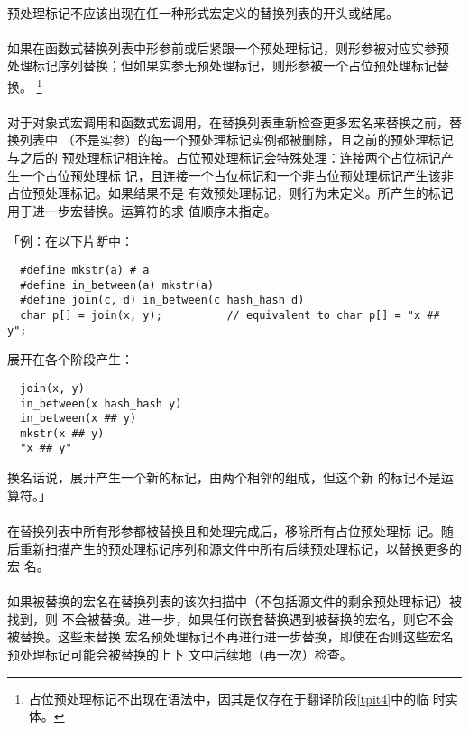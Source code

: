 \paragraph{}
\tm{\#\#}预处理标记不应该出现在任一种形式宏定义的替换列表的开头或结尾。

\paragraph{}
如果在函数式替换列表中形参前或后紧跟一个\tm{\#\#}预处理标记，则形参被对应实参预
处理标记序列替换；但如果实参无预处理标记，则形参被一个占位预处理标记替换。
\footnote{占位预处理标记不出现在语法中，因其是仅存在于翻译阶段\ref{tpit4}中的临
时实体。}

\paragraph{}
对于对象式宏调用和函数式宏调用，在替换列表重新检查更多宏名来替换之前，替换列表中
（不是实参）的每一个\tm{\#\#}预处理标记实例都被删除，且之前的预处理标记与之后的
预处理标记相连接。占位预处理标记会特殊处理：连接两个占位标记产生一个占位预处理标
记，且连接一个占位标记和一个非占位预处理标记产生该非占位预处理标记。如果结果不是
有效预处理标记，则行为未定义。所产生的标记用于进一步宏替换。\tm{\#\#}运算符的求
值顺序未指定。

「例：在以下片断中：
\begin{lstlisting}
  #define mkstr(a) # a
  #define in_between(a) mkstr(a)
  #define join(c, d) in_between(c hash_hash d)
  char p[] = join(x, y);          // equivalent to char p[] = "x ## y";
\end{lstlisting}
展开在各个阶段产生：
\begin{lstlisting}
  join(x, y)
  in_between(x hash_hash y)
  in_between(x ## y)
  mkstr(x ## y)
  "x ## y"
\end{lstlisting}
换名话说，展开产生一个新的标记，由两个相邻的\tm{\#}组成，但这个新
的标记不是\tm{\#\#}运算符。」

\paragraph{}
在替换列表中所有形参都被替换且\tm{\#}和\tm{\#\#}处理完成后，移除所有占位预处理标
记。随后重新扫描产生的预处理标记序列和源文件中所有后续预处理标记，以替换更多的宏
名。

\paragraph{}
如果被替换的宏名在替换列表的该次扫描中（不包括源文件的剩余预处理标记）被找到，则
不会被替换。进一步，如果任何嵌套替换遇到被替换的宏名，则它不会被替换。这些未替换
宏名预处理标记不再进行进一步替换，即使在否则这些宏名预处理标记可能会被替换的上下
文中后续地（再一次）检查。

